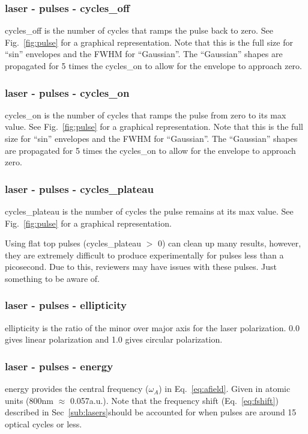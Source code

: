 \documentclass{article}
\begin{document}
\subsubsection{laser - pulses - cycles\_off}
cycles\_off is the number of cycles that ramps the pulse back to zero. See Fig.~\ref{fig:pulse} for a graphical representation. Note that this is the full size for ``sin'' envelopes and the FWHM for ``Gaussian''. The ``Gaussian'' shapes are propagated for 5 times the cycles\_on to allow for the envelope to approach zero.

\subsubsection{laser - pulses - cycles\_on}
cycles\_on is the number of cycles that ramps the pulse from zero to its max value. See Fig.~\ref{fig:pulse} for a graphical representation. Note that this is the full size for ``sin'' envelopes and the FWHM for ``Gaussian''. The ``Gaussian'' shapes are propagated for 5 times the cycles\_on to allow for the envelope to approach zero.

\subsubsection{laser - pulses - cycles\_plateau}
cycles\_plateau is the number of cycles the pulse remains at its max value. See Fig.~\ref{fig:pulse} for a graphical representation.

Using flat top pulses (cycles\_plateau $>$ 0) can clean up many results, however, they are extremely difficult to produce experimentally for pulses less than a picosecond. Due to this, reviewers may have issues with these pulses. Just something to be aware of.

\subsubsection{laser - pulses - ellipticity}
ellipticity is the ratio of the minor over major axis for the laser polarization. 0.0 gives linear polarization and 1.0 gives circular polarization.

\subsubsection{laser - pulses - energy}
energy provides the central frequency ($\omega_A$) in Eq.~\ref{eq:afield}. Given in atomic units (800nm $\approx$ 0.057a.u.). Note that the frequency shift (Eq.~\ref{eq:fshift}) described in Sec~\ref{sub:lasers}should be accounted for when pulses are around 15 optical cycles or less.
\end{document}
